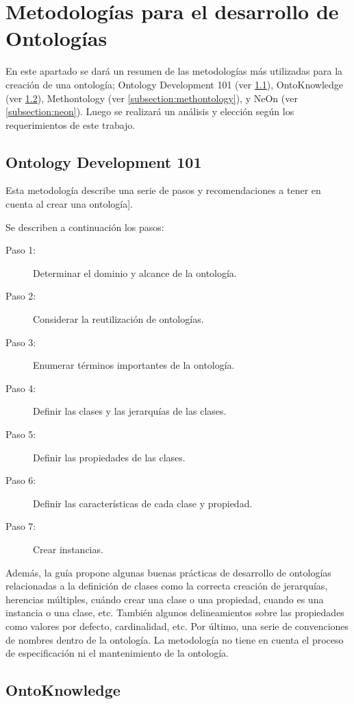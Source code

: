\section{Metodologías para el desarrollo de Ontologías}

En este apartado se dará un resumen de las metodologías más utilizadas para la creación de una ontología; Ontology Development 101 (ver \ref{subsection:101}), OntoKnowledge (ver \ref{subsection:ontoknowledge}), Methontology (ver \ref{subsection:methontology}), y NeOn (ver \ref{subsection:neon}). Luego se realizará un análisis y elección según los requerimientos de este trabajo.

\subsection{Ontology Development 101}
\label{subsection:101}

Esta metodología describe una serie de pasos y recomendaciones a tener en cuenta al crear una ontología]\cite{noy2001ontology}. 

Se describen a continuación los pasos:
\begin{description}
\item[Paso 1:] Determinar el dominio y alcance de la ontología.
\item[Paso 2:] Considerar la reutilización de ontologías.
\item[Paso 3:] Enumerar términos importantes de la ontología.
\item[Paso 4:] Definir las clases y las jerarquías de las clases.
\item[Paso 5:] Definir las propiedades de las clases.
\item[Paso 6:] Definir las características de cada clase y propiedad.
\item[Paso 7:] Crear instancias.
\end{description}

Además, la guía propone algunas buenas prácticas de desarrollo de ontologías relacionadas a la definición de clases como la correcta creación de jerarquías, herencias múltiples,  cuándo crear una clase o una propiedad, cuando es una instancia o una clase, etc. También algunos delineamientos sobre las propiedades como valores por defecto, cardinalidad, etc. Por último, una serie de convenciones de nombres dentro de la ontología. La metodología no tiene en cuenta el proceso de especificación ni el mantenimiento de la ontología.

\subsection{OntoKnowledge} 
\label{subsection:ontoknowledge}


